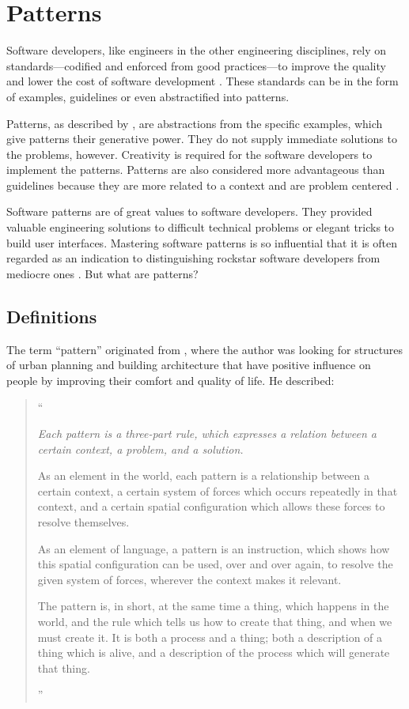 \documentclass[a4paper,titlepage]{article}
\begin{document}
\citet{unix:raymond}


\section{Patterns}
\label{sec:pattern}
Software developers, like engineers in the other engineering
disciplines, rely on standards---codified and enforced from good
practices---to improve the quality and lower the cost of software
development \citep{practice:ipenz}. These standards can be in the form
of examples, guidelines or even abstractified into patterns.

Patterns, as described by \citet{patterns:griffiths}, are abstractions
from the specific examples, which give patterns their generative
power. They do not supply immediate solutions to the problems,
however. Creativity is required for the software developers to
implement the patterns. Patterns are also considered more advantageous
than guidelines because they are more related to a context and are
problem centered \citep{patterns:welie}.

Software patterns are of great values to software developers. They
provided valuable engineering solutions to difficult technical
problems or elegant tricks to build user interfaces. Mastering
software patterns is so influential that it is often regarded as an
indication to distinguishing rockstar software developers from
mediocre ones \citep{rockstar:iskold}. But what are patterns?

\subsection{Definitions}
The term ``pattern'' originated from \citet{timeless:alexander}, where
the author was looking for structures of urban planning and building
architecture that have positive influence on people by improving their
comfort and quality of life. He described:
\begin{quote}
  ``{\it Each pattern is a three-part rule, which expresses a relation
    between a certain context, a problem, and a solution.

    As an element in the world, each pattern is a relationship between a
    certain context, a certain system of forces which occurs repeatedly in
    that context, and a certain spatial configuration which allows these
    forces to resolve themselves.

    As an element of language, a pattern is an instruction, which shows
    how this spatial configuration can be used, over and over again, to
    resolve the given system of forces, wherever the context makes it
    relevant.

    The pattern is, in short, at the same time a thing, which happens in
    the world, and the rule which tells us how to create that thing, and
    when we must create it. It is both a process and a thing; both a
    description of a thing which is alive, and a description of the
    process which will generate that thing.}''

  \raggedleft \citep[p. 247]{timeless:alexander}
\end{quote}
\end{document}
